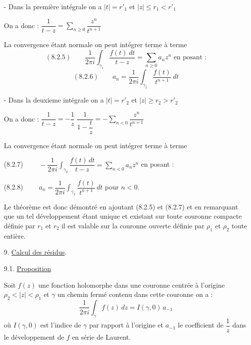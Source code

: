 \documentclass[11pt]{article}
\newcommand{\scanpage}[1]{\par\bigskip\noindent{\small\sffamily[scan #1]}\par}
\newcommand{\mspage}[1]{{\small\sffamily[p.\,#1]}}
\newcommand{\hand}[1]{\textcolor{blue}{#1}}
\newcommand{\uline}[1]{\underline{#1}}
\begin{document}
- Dans la première intégrale on a $|t| = r'_1$ et $|z| \leq r_1 < r'_1$

On a donc : $\dfrac{1}{t-z} = \sum\limits_{n \geq 0} \dfrac{z^n}{t^{n+1}}$

La convergence étant normale on peut intégrer terme à terme
\[ (8.2.5) \qquad \frac{1}{2\pi i} \int_{\gamma_1} \frac{f(t)\ dt}{t-z} = \sum_{n \geq 0} a_n z^n \text{ en posant :} \]
\[ (8.2.6) \qquad a_n = \frac{1}{2\pi i}\int_{\gamma_1} \frac{f(t)}{t^{n+1}}\ dt \]

\mspage{\hand{188}}

\clearpage
\scanpage{119/189}
\mspage{- 8 -}

- Dans la deuxieme intégrale on a $|t| = r'_2$ et $|z| \geq r_2 > r'_2$

On a donc : $\dfrac{1}{t-z} = -\dfrac{1}{z}\;\dfrac{1}{1-\dfrac{t}{z}} = -\sum\limits_{n<0} \dfrac{z^n}{t^{n+1}}$

La convergence étant normale on peut intégrer terme à terme

(8.2.7) $\qquad -\dfrac{1}{2\pi i}\displaystyle\int_{\gamma_2} \dfrac{f(t)\,dt}{t-z} = \sum\limits_{n<0} a_n z^n$ en posant :

(8.2.8) $\qquad a_n = \dfrac{1}{2\pi i}\displaystyle\int_{\gamma_2} \dfrac{f(t)}{t^{n+1}}\,dt$ pour $n<0$.

Le théorème est donc démontré en ajoutant (8.2.5) et (8.2.7) et en
remarquant que un tel développement étant unique et existant sur toute couronne
compacte définie par $r_1$ et $r_2$ il est valable sur la couronne ouverte définie
par $\rho_1$ et $\rho_2$ toute entière.

9. \uline{Calcul des résidus}.

9.1. \uline{Proposition}

Soit $f(z)$ une fonction holomorphe dans une couronne centrée à
l'origine $\rho_2 < |z| < \rho_1$ et $\gamma$ un chemin fermé contenu dans cette couronne
on a :
\[ \frac{1}{2\pi i}\int_\gamma f(z)\,dz = I(\gamma,0)\,a_{-1} \]
où $I(\gamma,0)$ est l'indice de $\gamma$ par rapport à l'origine et $a_{-1}$ le coefficient
de $\dfrac{1}{z}$ dans le développement de $f$ en série de Laurent.
\end{document}
